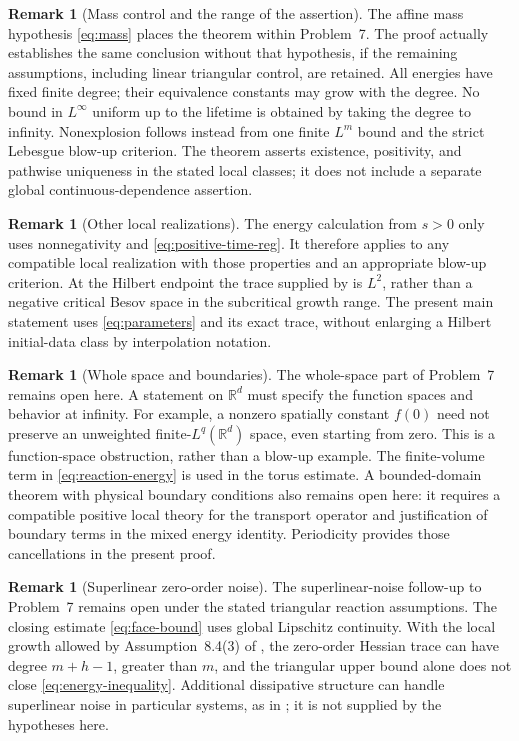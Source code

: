 \documentclass[11pt]{amsart}
\theoremstyle{definition}
\newtheorem{remark}[theorem]{Remark}
\newcommand{\R}{\mathbb R}
\numberwithin{equation}{section}
\begin{document}
\begin{remark}[Mass control and the range of the assertion]
The affine mass hypothesis \eqref{eq:mass} places the theorem within
Problem~7. The proof actually establishes the same conclusion without
that hypothesis, if the remaining assumptions, including linear
triangular control, are retained. All energies have fixed finite degree;
their equivalence constants may grow with the degree. No bound in
$L^\infty$ uniform up to the lifetime is obtained by taking the degree
to infinity. Nonexplosion follows instead from one finite $L^m$ bound
and the strict Lebesgue blow-up criterion. The theorem asserts existence,
positivity, and pathwise uniqueness in the stated local classes; it
does not include a separate global continuous-dependence assertion.
\end{remark}

\begin{remark}[Other local realizations]
The energy calculation from $s>0$ only uses nonnegativity and
\eqref{eq:positive-time-reg}. It therefore applies to any compatible
local realization with those properties and an appropriate blow-up
criterion. At the Hilbert endpoint the trace supplied by
\cite[Proposition~7.1, p.~34]{AVlocal} is $L^2$, rather than a negative
critical Besov space in the subcritical growth range. The present main
statement uses \eqref{eq:parameters} and its exact trace, without
enlarging a Hilbert initial-data class by interpolation notation.
\end{remark}

\begin{remark}[Whole space and boundaries]
The whole-space part of Problem~7 remains open here. A statement on
$\R^d$ must specify the function spaces and behavior at infinity.
For example, a nonzero spatially constant $f(0)$ need not preserve
an unweighted finite-$L^q(\R^d)$ space, even starting from zero.
This is a function-space obstruction, rather than a blow-up example.
The finite-volume term in \eqref{eq:reaction-energy} is used in the
torus estimate. A bounded-domain theorem with physical boundary
conditions also remains open here: it requires a compatible positive
local theory for the transport operator and justification of boundary
terms in the mixed energy identity. Periodicity provides those
cancellations in the present proof.
\end{remark}

\begin{remark}[Superlinear zero-order noise]
The superlinear-noise follow-up to Problem~7 remains open under the
stated triangular reaction assumptions. The closing estimate
\eqref{eq:face-bound} uses global Lipschitz continuity. With the local
growth allowed by Assumption~8.4(3) of \cite{AVsurvey}, the zero-order
Hessian trace can have degree $m+h-1$, greater than $m$, and the
triangular upper bound alone does not close
\eqref{eq:energy-inequality}. Additional dissipative structure can
handle superlinear noise in particular systems, as in
\cite{AVglobal}; it is not supplied by the hypotheses here.
\end{remark}
\end{document}
